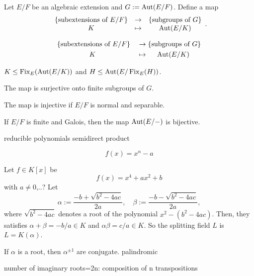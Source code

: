 \documentclass{../../large}
\begin{document}
\begin{prb}
Let $E/F$ be an algebraic extension and $G:=\operatorname{Aut}(E/F)$.
Define a map
\[\begin{array}{ccc}
\{\text{subextensions of $E/F$}\}
&\to&
\{\text{subgroups of $G$}\}\\
K&\mapsto&\operatorname{Aut}(E/K)
\end{array}.\]

\begin{alignat*}{2}
&\{\text{subextensions of $E/F$}\}
&&\to \{\text{subgroups of $G$}\} \\
&\ccol{}{K}
&&\ccol{\mapsto}{\Aut(E/K)}
\end{alignat*}

\begin{parts}
\item $K\le \operatorname{Fix}_E(\operatorname{Aut}(E/K))$ and $H\le\operatorname{Aut}(E/\operatorname{Fix}_E(H))$.
\item The map is surjective onto finite subgroups of $G$.
\item The map is injective if $E/F$ is normal and separable.
\item If $E/F$ is finite and Galois, then the map $\operatorname{Aut}(E/-)$ is bijective.
\end{parts}
\end{prb}




reducible polynomials
semidirect product


\begin{prb}
\[f(x)=x^n-a\]
\end{prb}

\begin{prb}
Let $f\in K[x]$ be
\[f(x)=x^4+ax^2+b\]
with $a\ne0$,..?
Let
\[\alpha:=\frac{-b+\sqrt{b^2-4ac}}{2a},\quad\beta:=\frac{-b-\sqrt{b^2-4ac}}{2a},\]
where $\sqrt{b^2-4ac}$ denotes a root of the polynomial $x^2-(b^2-4ac)$.
Then, they satisfies $\alpha+\beta=-b/a\in K$ and $\alpha\beta=c/a\in K$.
So the splitting field $L$ is $L=K(\alpha)$.
\end{prb}

\begin{prb}
If $\alpha$ is a root, then $\alpha^{\pm1}$ are conjugate.
palindromic
\end{prb}

\begin{prb}
number of imaginary roots=2n: composition of n transpositions
\end{prb}
\end{document}
